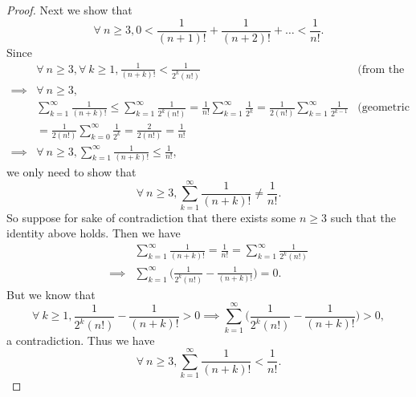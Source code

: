 \begin{proof}
    Next we show that
    \[
        \forall\ n \geq 3, 0 < \frac{1}{(n + 1)!} + \frac{1}{(n + 2)!} + \dots < \frac{1}{n!}.
    \]
    Since
    \begin{align*}
                 & \forall\ n \geq 3, \forall\ k \geq 1, \frac{1}{(n + k)!} < \frac{1}{2^k (n!)}                                                                                                                  & \text{(from the proof above)} \\
        \implies & \forall\ n \geq 3,                                                                                                                                                                                                             \\
                 & \sum_{k = 1}^\infty \frac{1}{(n + k)!} \leq \sum_{k = 1}^\infty \frac{1}{2^k (n!)} = \frac{1}{n!} \sum_{k = 1}^\infty \frac{1}{2^k} = \frac{1}{2 (n!)} \sum_{k = 1}^\infty \frac{1}{2^{k - 1}} & \text{(geometric series)}     \\
                 & = \frac{1}{2 (n!)} \sum_{k = 0}^\infty \frac{1}{2^k} = \frac{2}{2 (n!)} = \frac{1}{n!}                                                                                                                                         \\
        \implies & \forall\ n \geq 3, \sum_{k = 1}^\infty \frac{1}{(n + k)!} \leq \frac{1}{n!},
    \end{align*}
    we only need to show that
    \[
        \forall\ n \geq 3, \sum_{k = 1}^\infty \frac{1}{(n + k)!} \neq \frac{1}{n!}.
    \]
    So suppose for sake of contradiction that there exists some \(n \geq 3\) such that the identity above holds.
    Then we have
    \begin{align*}
                 & \sum_{k = 1}^\infty \frac{1}{(n + k)!} = \frac{1}{n!} = \sum_{k = 1}^\infty \frac{1}{2^k (n!)} \\
        \implies & \sum_{k = 1}^\infty \bigg(\frac{1}{2^k (n!)} - \frac{1}{(n + k)!}\bigg) = 0.
    \end{align*}
    But we know that
    \[
        \forall\ k \geq 1, \frac{1}{2^k (n!)} - \frac{1}{(n + k)!} > 0 \implies \sum_{k = 1}^\infty \bigg(\frac{1}{2^k (n!)} - \frac{1}{(n + k)!}\bigg) > 0,
    \]
    a contradiction.
    Thus we have
    \[
        \forall\ n \geq 3, \sum_{k = 1}^\infty \frac{1}{(n + k)!} < \frac{1}{n!}.
    \]


\end{proof}
